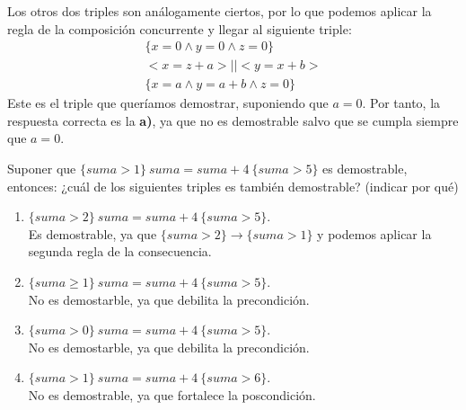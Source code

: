 \begin{ejercicio}
    Los otros dos triples son análogamente ciertos, por lo que podemos aplicar la regla de la composición concurrente y llegar al siguiente triple:
    \begin{gather*}
        \{x=0 \land y = 0 \land z = 0\} \\
        <x = z + a> || <y = x+b> \\
        \{x = a \land  y = a +b \land z = 0\}
    \end{gather*}
    Este es el triple que queríamos demostrar, suponiendo que \ul{$a=0$}. Por tanto, la respuesta correcta es la \textbf{a)}, ya que no es demostrable salvo que se cumpla siempre que $a=0$.

\end{ejercicio}

\begin{ejercicio}
    Suponer que $\{suma>1\}\ suma=suma+4\ \{suma>5\}$ es demostrable, entonces: ¿cuál de los siguientes triples es también demostrable? (indicar por qué)
    \begin{enumerate}
        \item $\{suma>2\}\ suma=suma+4\ \{suma>5\}$.\\
            Es demostrable, ya que $\{suma>2\}\rightarrow\{suma>1\}$ y podemos aplicar la segunda regla de la consecuencia.
        \item $\{suma\geq 1\}\ suma=suma+4\ \{suma > 5\}$.\\
            No es demostarble, ya que debilita la precondición.
        \item $\{suma>0\}\ suma=suma+4\ \{suma > 5\}$.\\
            No es demostarble, ya que debilita la precondición.
        \item $\{suma>1\}\ suma=suma+4\ \{suma > 6\}$.\\
            No es demostrable, ya que fortalece la poscondición.
    \end{enumerate}
\end{ejercicio}

